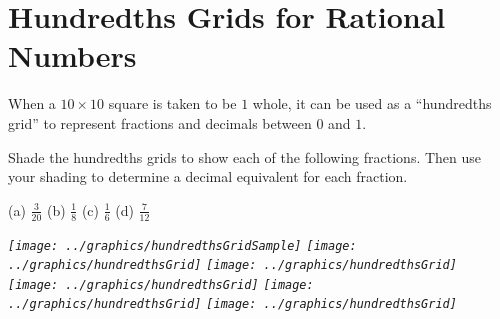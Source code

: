 \newpage
\section{Hundredths Grids for Rational Numbers}\label{A:hundredthsGrids}


When a $10\times 10$ square is taken to be $1$ whole, it can be used as a ``hundredths grid'' 
to represent fractions and decimals between $0$ and $1$.

\begin{prob}
Shade the hundredths grids to show each of the following fractions.  Then use your shading to determine a decimal equivalent for each fraction.  
\begin{center}
\hfill (a) $\frac{3}{20}$ \hfill (b) $\frac{1}{8}$ \hfill (c) $\frac{1}{6}$ \hfill (d) $\frac{7}{12}$ \hfill
\end{center}

\begin{fullwidth}\em\em\quad
\texttt{[image: ../graphics/hundredthsGridSample]}\quad
\texttt{[image: ../graphics/hundredthsGrid]}\quad
\texttt{[image: ../graphics/hundredthsGrid]}\\

\texttt{[image: ../graphics/hundredthsGrid]}\quad
\texttt{[image: ../graphics/hundredthsGrid]}\quad
\texttt{[image: ../graphics/hundredthsGrid]}
\end{fullwidth}

\end{prob}



